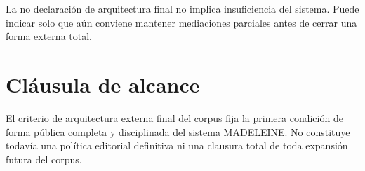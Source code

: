 \begin{observation}
La no declaración de arquitectura final no implica insuficiencia del sistema. Puede indicar solo que aún conviene mantener mediaciones parciales antes de cerrar una forma externa total.
\end{observation}

\section{Cláusula de alcance}
\begin{observation}
El criterio de arquitectura externa final del corpus fija la primera condición de forma pública completa y disciplinada del sistema MADELEINE. No constituye todavía una política editorial definitiva ni una clausura total de toda expansión futura del corpus.
\end{observation}


